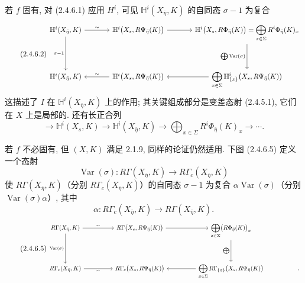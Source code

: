 若 $f$ 固有, 对 (2.4.6.1) 应用 $H^i$, 可见 $\mathbb H^i(X_{\bar\eta},K)$ 的自同态 $\sigma-1$ 为复合
\begin{equation}\tag{2.4.6.2}
\resizebox{\textwidth}{!}{%
\begin{tikzcd}[ampersand replacement=\&, column sep=large, row sep=huge]
\mathbb H^i(X_{\bar\eta},K)
  \arrow[r, "\sim"] \arrow[d, "\sigma-1"']
  \& \mathbb H^i\bigl(X_s,R\Psi_{\bar\eta}(K)\bigr)
     \arrow[r]
  \& \mathbb H^i\bigl(X_s,R\Phi_{\bar\eta}(K)\bigr)
     =\displaystyle\bigoplus_{x\in\Sigma}R^i\Phi_{\bar\eta}(K)_x
     \arrow[d, "{\bigoplus\operatorname{Var}(\sigma)}"'] \\
\mathbb H^i(X_{\bar\eta},K)
  \& \mathbb H^i\bigl(X_s,R\Psi_{\bar\eta}(K)\bigr)
     \arrow[l, "\sim"']
  \& \displaystyle\bigoplus_{x\in\Sigma}
     \mathbb H^i_{\{x\}}\bigl(X_s,R\Psi_{\bar\eta}(K)\bigr)
     \arrow[l]
\end{tikzcd}}
\end{equation}
这描述了 $I$ 在 $\mathbb H^i(X_{\bar\eta},K)$ 上的作用; 其关键组成部分是变差态射 (2.4.5.1), 它们在 $X$ 上是局部的. 还有长正合列
\begin{equation}\tag{2.4.6.3}
\longrightarrow \mathbb H^i(X_s,K)
\longrightarrow \mathbb H^i(X_{\bar\eta},K)
\longrightarrow \bigoplus_{x\in\Sigma}R^i\Phi_{\bar\eta}(K)_x
\longrightarrow\cdots .
\end{equation}

若 $f$ 不必固有, 但 $(X,K)$ 满足 2.1.9, 同样的论证仍然适用. 下图 (2.4.6.5) 定义一个态射
\begin{equation}\tag{2.4.6.4}
\operatorname{Var}(\sigma):
R\Gamma(X_{\bar\eta},K)\longrightarrow R\Gamma_c(X_{\bar\eta},K)
\end{equation}
使 $R\Gamma(X_{\bar\eta},K)$（分别 $R\Gamma_c(X_{\bar\eta},K)$）的自同态 $\sigma-1$ 为复合 $\alpha\operatorname{Var}(\sigma)$（分别 $\operatorname{Var}(\sigma)\alpha$）, 其中
\[
\alpha:R\Gamma_c(X_{\bar\eta},K)\longrightarrow
R\Gamma(X_{\bar\eta},K).
\]
\begin{equation}\tag{2.4.6.5}
\resizebox{\textwidth}{!}{%
\begin{tikzcd}[ampersand replacement=\&, column sep=huge, row sep=huge]
R\Gamma(X_{\bar\eta},K)
  \arrow[r, "\sim"] \arrow[d, "\operatorname{Var}(\sigma)"']
  \& R\Gamma\bigl(X_s,R\Psi_{\bar\eta}(K)\bigr)
     \arrow[r]
  \& \displaystyle\bigoplus_{x\in\Sigma}
     \bigl(R\Phi_{\bar\eta}(K)\bigr)_x
     \arrow[d, "\bigoplus"']
  \& {} \\
R\Gamma_c(X_{\bar\eta},K)
  \arrow[r, "\sim"']
  \& R\Gamma_c\bigl(X_s,R\Psi_{\bar\eta}(K)\bigr)
  \& \displaystyle\bigoplus_{x\in\Sigma}
     R\Gamma_{\{x\}}\bigl(X_s,R\Psi_{\bar\eta}(K)\bigr)
     \arrow[l]
  \& .
\end{tikzcd}}
\end{equation}

